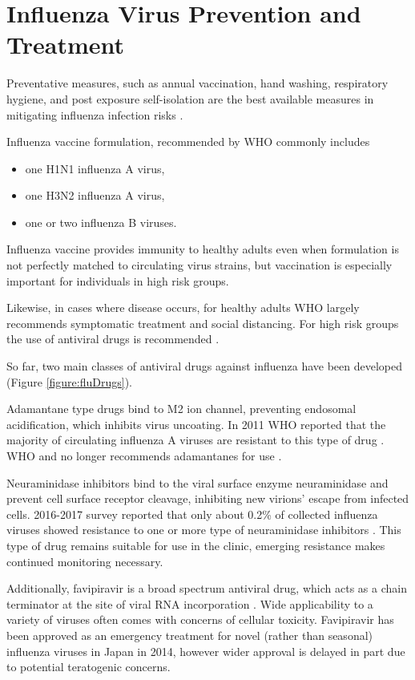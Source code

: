 \section{Influenza Virus Prevention and Treatment}

Preventative measures, such as annual vaccination, hand washing, respiratory hygiene, and post exposure self-isolation are the best available measures in mitigating influenza infection risks \cite{influenza_seasonal_2018}.

Influenza vaccine formulation, recommended by WHO commonly includes \cite{RecommendedCompositionVaccines}

\begin{itemize}
    \item one H1N1 influenza A virus,
    \item one H3N2 influenza A virus,
    \item one or two influenza B viruses.
\end{itemize}

Influenza vaccine provides immunity to healthy adults even when formulation is not perfectly matched to circulating virus strains, but vaccination is especially important for individuals in high risk groups.

Likewise, in cases where disease occurs, for healthy adults WHO largely recommends symptomatic treatment and social distancing. For high risk groups the use of antiviral drugs is recommended \cite{influenza_seasonal_2018}.

So far, two main classes of antiviral drugs against influenza have been developed (Figure \ref{figure:fluDrugs}).

Adamantane type drugs bind to M2 ion channel, preventing endosomal acidification, which inhibits virus uncoating. In 2011 WHO reported that the majority of circulating influenza A viruses are resistant to this type of drug \cite{whoAntivirals2011}. WHO and no longer recommends adamantanes for use \cite{influenza_seasonal_2018}.

Neuraminidase inhibitors bind to the viral surface enzyme neuraminidase and prevent cell surface receptor cleavage, inhibiting new virions' escape from infected cells. 2016-2017 survey reported that only about 0.2\% of collected influenza viruses showed resistance to one or more type of neuraminidase inhibitors \cite{lackenby2018global}. This type of drug remains suitable for use in the clinic, emerging resistance makes continued monitoring necessary.

Additionally, favipiravir is a broad spectrum antiviral drug, which acts as a chain terminator at the site of viral RNA incorporation \cite{shiraki2020favipiravir}. Wide applicability to a variety of viruses often comes with concerns of cellular toxicity. Favipiravir has been approved as an emergency treatment for novel (rather than seasonal) influenza viruses in Japan in 2014, however wider approval is delayed in part due to potential teratogenic concerns.

